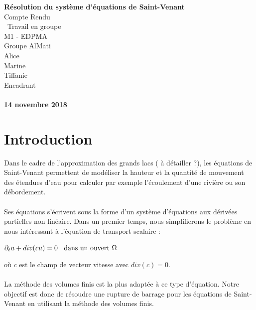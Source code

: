 \documentclass[12pt]{article}
\begin{document}
\begin{titlepage}
\begin{center}


\vspace{3cm}

\huge
\textbf{Résolution du système d'équations de Saint-Venant} \\
\vspace{0.7cm}
\Large
Compte Rendu\\
\ Travail en groupe \\
\large
\vspace{0.7cm}
M1 - EDPMA\\
Groupe AlMati\\
\vspace{0.7cm}
Alice  \\ Marine  \\ Tiffanie  \\
\vspace{0.7cm}
Encadrant\\
\\
\vspace{2cm}
\Large
\textbf{14 novembre 2018}
\end{center}
\end{titlepage}

\normalsize

\newpage
\tableofcontents
\newpage
\section{Introduction}

\noindent Dans le cadre de l'approximation des grands lacs ( à détailler ?), les équations de Saint-Venant permettent de modéliser la hauteur et la quantité de mouvement des étendues d'eau pour calculer par exemple l'écoulement d'une rivière ou son débordement. 
\\
\\Ses équations s'écrivent sous la forme d'un système d'équations aux dérivées partielles non linéaire. Dans un premier temps, nous simplifierons le problème en nous intéressant à l'équation de transport scalaire :

\begin{center}
    $\partial_t u + div(cu) = 0 \text{ \: dans un ouvert } \Omega $
\end{center}

\noindent où $c$ est le champ de vecteur vitesse avec $div(c)=0$. 
\\
\\La méthode des volumes finis est la plus adaptée à ce type d'équation. Notre objectif est donc de résoudre une rupture de barrage pour les équations de Saint-Venant \cite{ref1} en utilisant la méthode des volumes finis.
\end{document}
